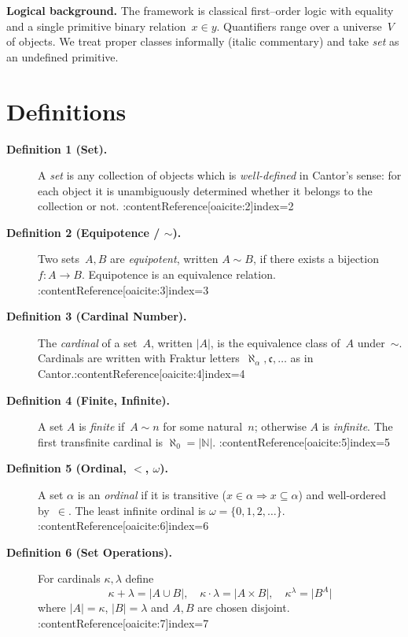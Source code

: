 \documentclass[11pt]{article}
\begin{document}
\bigskip
\noindent\textbf{Logical background.}
The framework is classical first–order logic with equality and a single
primitive binary relation~$x\in y$.  Quantifiers range over a universe~$V$
of objects.  We treat proper classes informally (italic commentary) and
take \emph{set} as an undefined primitive. 

\section*{Definitions}
\begin{description}
\item[\textbf{Definition 1 (Set).}]
A \emph{set} is any collection of objects which is \emph{well-defined} in
Cantor’s sense: for each object it is unambiguously determined whether
it belongs to the collection or not. :contentReference[oaicite:2]{index=2}

\item[\textbf{Definition 2 (Equipotence / $\sim$).}]
Two sets~$A,B$ are \emph{equipotent}, written $A\sim B$, if there exists
a bijection $f:A\to B$.  Equipotence is an equivalence relation. :contentReference[oaicite:3]{index=3}

\item[\textbf{Definition 3 (Cardinal Number).}]
The \emph{cardinal} of a set~$A$, written $\lvert A\rvert$, is the
equivalence class of~$A$ under~$\sim$.  Cardinals are written with
Fraktur letters~$\aleph_\alpha,\mathfrak{c},\ldots$ as in Cantor.:contentReference[oaicite:4]{index=4}

\item[\textbf{Definition 4 (Finite, Infinite).}]
A set $A$ is \emph{finite} if~$A\sim n$ for some natural~$n$; otherwise
$A$ is \emph{infinite}.  The first transfinite cardinal is
$\aleph_0=\lvert\mathbb N\rvert$. :contentReference[oaicite:5]{index=5}

\item[\textbf{Definition 5 (Ordinal, $<$, $\omega$).}]
A set $\alpha$ is an \emph{ordinal} if it is transitive
($x\in\alpha\Rightarrow x\subseteq\alpha$) and well-ordered by~$\in$.
The least infinite ordinal is $\omega=\{0,1,2,\dots\}$. :contentReference[oaicite:6]{index=6}

\item[\textbf{Definition 6 (Set Operations).}]
For cardinals $\kappa,\lambda$ define
\[
\kappa+\lambda=\lvert A\cup B\rvert,\quad
\kappa\cdot\lambda=\lvert A\times B\rvert,\quad
\kappa^{\lambda}=\lvert B^{A}\rvert
\]
where $\lvert A\rvert=\kappa$, $\lvert B\rvert=\lambda$ and $A,B$ are
chosen disjoint. :contentReference[oaicite:7]{index=7}

\end{description}
\end{document}
